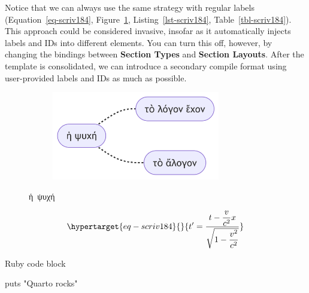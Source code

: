 \documentclass[
  12pt,
  a4paper,
  numbers=noenddot,
  titlepage,
  toclink=all,
  toc=bibliography]{scrbook}
\newenvironment{Shaded}{\begin{snugshade}}{\end{snugshade}}
\newcommand{\FunctionTok}[1]{\textcolor[rgb]{0.28,0.35,0.67}{#1}}
\newcommand{\StringTok}[1]{\textcolor[rgb]{0.13,0.47,0.30}{#1}}
\theoremstyle{plain}
\theoremstyle{plain}
\theoremstyle{definition}
\theoremstyle{plain}
\theoremstyle{definition}
\theoremstyle{definition}
\theoremstyle{plain}
\theoremstyle{plain}
\theoremstyle{remark}
\begin{document}
\protect\hypertarget{scriv184}{}{}

Notice that we can always use the same strategy with regular labels
(\protect\hypertarget{cite_53}{}{\label{cite_53}Equation~\ref{eq-scriv184}},
\protect\hypertarget{cite_54}{}{\label{cite_54}Figure~\ref{fig-scriv184}},
\protect\hypertarget{cite_55}{}{\label{cite_55}Listing~\ref{lst-scriv184}},
\protect\hypertarget{cite_56}{}{\label{cite_56}Table~\ref{tbl-scriv184}}).
This approach could be considered invasive, insofar as it automatically
injects labels and IDs into different elements. You can turn this off,
however, by changing the bindings between \textbf{Section Types} and
\textbf{Section Layouts}. After the template is consolidated, we can
introduce a secondary compile format using user-provided labels and IDs
as much as possible.

\begin{figure}

{\centering 

\begin{figure}[H]

{\centering \includegraphics[width=2.89in,height=1.52in]{export_files/figure-latex/mermaid-figure-2.png}

}

\end{figure}

}

\caption{\label{fig-scriv184}ἡ~ψυχή}

\end{figure}

\begin{equation}\protect\hypertarget{eq-scriv184}{}{t' = \frac{t - \dfrac{v}{c^{2}}x}{\sqrt{1 - \dfrac{v^{2}}{c^{2}}}}}\label{eq-scriv184}\end{equation}

\begin{codelisting}

\caption{Ruby code block}

\hypertarget{lst-scriv184}{%
\label{lst-scriv184}}%
\begin{Shaded}
\begin{Highlighting}[numbers=left,,]
\FunctionTok{puts} \StringTok{"Quarto rocks"}
\end{Highlighting}
\end{Shaded}

\end{codelisting}
\end{document}
